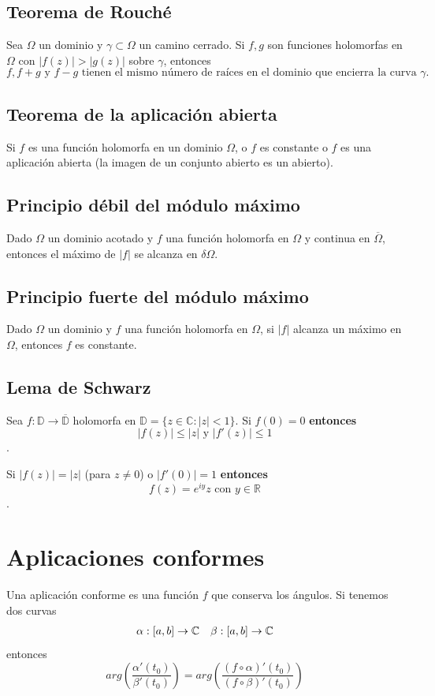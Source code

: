 \documentclass[paper=a4, fontsize=11pt]{scrartcl}
\numberwithin{equation}{section}
\numberwithin{figure}{section}
\numberwithin{table}{section}
\begin{document}
\subsection{Teorema de Rouché}
Sea $\Omega$ un dominio y $\gamma\subset\Omega$ un camino cerrado. Si $f,g$ son funciones holomorfas en $\Omega$ con $|f(z)|>|g(z)|$ sobre $\gamma$, entonces
$$f, f+g \text{ y } f-g \text{ tienen el mismo número de raíces en el dominio que encierra la curva } \gamma.$$

\subsection{Teorema de la aplicación abierta}
Si $f$ es una función holomorfa en un dominio $\Omega$, o $f$ es constante o $f$ es una aplicación abierta (la imagen de un conjunto abierto es un abierto).

\subsection{Principio débil del módulo máximo}
Dado $\Omega$ un dominio acotado y $f$ una función holomorfa en $\Omega$ y continua en $\overline{\Omega}$, entonces el máximo de $|f|$ se alcanza en $\delta\Omega$.

\subsection{Principio fuerte del módulo máximo}
Dado $\Omega$ un dominio y $f$ una función holomorfa en $\Omega$, si $|f|$ alcanza un máximo en $\Omega$, entonces $f$ es constante.

\subsection{Lema de Schwarz}
Sea $f:\mathbb{D}\to\overline{\mathbb{D}}$ holomorfa en $\mathbb{D}=\{z\in\mathbb{C}: |z|<1\}$. Si $\boxed{f(0) = 0}$ \textbf{entonces} $$\boxed{|f(z)|\le|z|}\text{ y }\boxed{|f'(z)| \le 1}$$.

Si $\boxed{|f(z)|=|z|}$ (para $z\neq 0$) o $\boxed{|f'(0)| = 1}$ \textbf{entonces} $$\boxed{f(z) = e^{iy}z}\text{ con }y\in\mathbb{R}$$.

\newpage
\section{Aplicaciones conformes}
Una aplicación conforme es una función $f$ que conserva los ángulos. Si tenemos dos curvas
$$
\begin{array}{l l}
\alpha:[a,b]\to\mathbb{C} & \beta:[a,b]\to\mathbb{C}
\end{array}
$$
entonces
$$arg\left(\frac{\alpha'(t_0)}{\beta'(t_0)}\right) = arg\left(\frac{\left(f\circ \alpha \right)'(t_0)}{\left(f\circ \beta \right)'(t_0)}\right)$$
\end{document}
